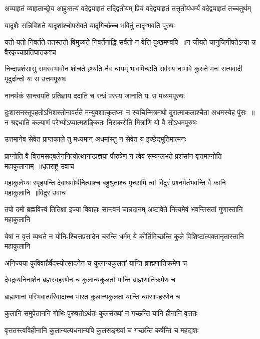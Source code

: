 \twolineshloka
{अव्याहृतं व्याहृताच्छ्रेय आहुःसत्यं वदेद्व्याहृतं तद्द्वितीयम्}
{प्रियं वदेद्व्याहृतं तत्तृतीयंधर्म्यं वदेद्व्याहृतं तच्चतुर्थम्}


\twolineshloka
{यादृशैः सन्निविशते यादृशांश्चोपसेवते}
{यादृगिच्छेच्च भवितुं तादृग्भवति पूरुषः}


\threelineshloka
{यतो यतो निवर्तते ततस्ततो विमुच्यते}
{निवर्तनाद्धि सर्वतो न वेत्ति दुःखमण्वपि ॥न जीयते चानुजिगीषतेऽन्या-न्न वैरकृच्चाप्रतिघातकश्च}
{}


निन्दाप्रशंसासु समस्वभावोन शोचते हृष्यति नैव चायम्
\twolineshloka
{भावमिच्छति सर्वस्य नाभावे कुरुते मनः}
{सत्यवादी मृदुर्दान्तो यः स उत्तमपूरुषः}


\twolineshloka
{नानर्थकं सान्त्वयति प्रतिज्ञाय ददाति च}
{रन्ध्रं परस्य जानाति यः स मध्यमपूरुषः}


\threelineshloka
{दुःशासनस्तूपहतोऽभिशस्तोनावर्तते मन्युवशात्कृतघ्नः}
{न स्यचिन्मित्रमथो दुरात्माकलाश्चैता अधमस्येह पुंसः ॥न श्रद्दधाति कल्याणं परेभ्योऽप्यात्मशङ्कितः}
{निराकरोति मित्राणि यो वै सोऽधमपूरुषः}


\twolineshloka
{उत्तमानेव सेवेत प्राप्तकाले तु मध्यमान्}
{अधमांस्तु न सेवेत य इच्छेद्भूतिमात्मनः}


\threelineshloka
{प्राग्नोति वै वित्तमसद्बलेननित्योत्थानात्प्रज्ञया पौरुषेण}
{न त्वेव सम्यग्लभते प्रशंसांन वृत्तमाप्नोति महाकुलानाम् ॥धृतराष्ट्र उवाच}
{}


\threelineshloka
{महाकुलेभ्यः स्पृहयन्ति देवाधर्मार्थनित्याश्च बहुश्रुताश्च}
{पृच्छामि त्वां विदुरं प्रश्नमेतंभवन्ति वै कानि महाकुलानि ॥विदुर उवाच}
{}


\threelineshloka
{तपो दमो ब्रह्मवित्त्वं तितिक्षा}
{इज्या विवाहाः सान्त्वनं चान्नदानम्}
{अष्टावेते नित्यमेवं भवन्तिसतां गुणास्तानि महाकुलानि}


\twolineshloka
{येषां न वृत्तं व्यथते न योनि-श्चित्तप्रसादेन चरन्ति धर्मम्}
{ये कीर्तिमिच्छन्ति कुले विशिष्टांत्यक्तानृतास्तानि महाकुलानि}


\twolineshloka
{अनिज्यया कुविवाहैर्वेदस्योत्सादनेन च}
{कुलान्यकुलतां यान्ति ब्राह्मणातिक्रमेण च}


\twolineshloka
{देवद्रव्यनिनाशेन ब्रह्मस्वहरणेन च}
{कुलान्यकुलतां यान्ति ब्राह्मणातिक्रमेण च}


\twolineshloka
{ब्राह्मणानां परिभवात्परिवादाच्च भारत}
{कुलान्यकुलतां यान्ति न्यासापहरणेन च}


\twolineshloka
{कुलानि समुपेताननि गोभिः पुरुषतोऽर्थतः}
{कुलसंख्यां न गच्छन्ति यानि हीनानि वृत्ततः}


\twolineshloka
{वृत्ततस्त्वविहीनानि कुलान्यल्पधनान्यपि}
{कुलसङ्ख्यां च गच्छन्ति कर्षन्ति च महद्यशः}


